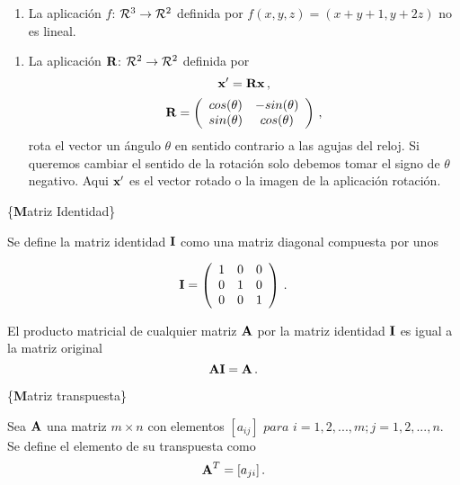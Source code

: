 \documentclass[
]{agujournal2019}
\providecommand{\tightlist}{%
  \setlength{\itemsep}{0pt}\setlength{\parskip}{0pt}}\usepackage{longtable,booktabs,array}
\begin{document}
\begin{enumerate}
\def\labelenumi{(\arabic{enumi})}
\setcounter{enumi}{1}
\tightlist
\item
  La aplicación \(f\): \({\cal R}^3 \rightarrow {\cal R}^2\) definida
  por \(f(x,y,z)=(x+y+1,y+2z)\) no es lineal.
\end{enumerate}

\vspace{0.5cm}

\begin{enumerate}
\def\labelenumi{(\arabic{enumi})}
\setcounter{enumi}{2}
\tightlist
\item
  La aplicación \({\textbf R}\): \({\cal R}^2 \rightarrow {\cal R}^2\)
  definida por \[{\textbf x}'={\textbf R}{\textbf x}\,,\]
  \[{\textbf R}=\left( \begin{array}{cc}
   cos(\theta) & -sin(\theta)\\
   sin(\theta) & cos(\theta)
     \end{array} \right)\,,\] rota el vector un ángulo \(\theta\) en
  sentido contrario a las agujas del reloj. Si queremos cambiar el
  sentido de la rotación solo debemos tomar el signo de \(\theta\)
  negativo. Aqui \({\textbf x}'\) es el vector rotado o la imagen de la
  aplicación rotación.
\end{enumerate}

\vspace{0.5cm}

\{\noindent \textbf Matriz Identidad\}

Se define la matriz identidad \({\textbf I}\) como una matriz diagonal
compuesta por unos

\[{\textbf I}=\left(\begin{array}{ccc}
  1 & 0 & 0\\
  0 & 1 & 0\\
  0 & 0 & 1
\end{array}\right)\,.\]

El producto matricial de cualquier matriz \({\textbf A}\) por la matriz
identidad \({\textbf I}\) es igual a la matriz original
\[{\textbf A}{\textbf I}={\textbf A}\,.\]

\vspace{0.5cm}

\{\noindent \textbf Matriz transpuesta\}

Sea \({\textbf A}\) una matriz \(m\times n\) con elementos
\([a_{ij}]\,\,{ para}\,\,i=1,2,...,m; j=1,2,...,n\). Se define el
elemento de su transpuesta como \[{\textbf A}^T=[a_{ji}]\,.\]
\end{document}
